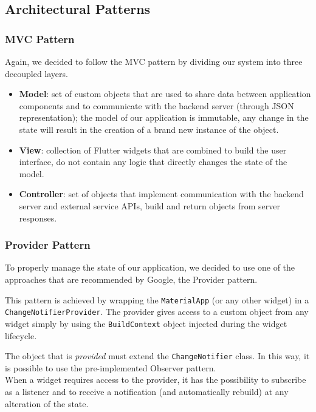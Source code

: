 \subsection{Architectural Patterns}

\subsubsection{MVC Pattern}
Again, we decided to follow the MVC pattern by dividing our system into three decoupled layers.
\begin{itemize}
      \item \textbf{Model}:
            set of custom objects that are used to share data between application components and to communicate with the backend server (through JSON representation);
            the model of our application is immutable, any change in the state will result in the creation of a brand new instance of the object.
      \item \textbf{View}:
            collection of Flutter widgets that are combined to build the user interface, do not contain any logic that directly changes the state of the model.
      \item \textbf{Controller}:
            set of objects that implement communication with the backend server and external service APIs, build and return objects from server responses.
\end{itemize}

\subsubsection{Provider Pattern}
\label{provider}
To properly manage the state of our application, we decided to use one of the approaches that are recommended by Google, the Provider pattern.

This pattern is achieved by wrapping the \texttt{MaterialApp} (or any other widget) in a \texttt{ChangeNotifierProvider}.
The provider gives access to a custom object from any widget simply by using the \texttt{BuildContext} object injected during the widget lifecycle.

The object that is \textit{provided} must extend the \texttt{ChangeNotifier} class. In this way, it is possible to use the pre-implemented Observer pattern.\\
When a widget requires access to the provider, it has the possibility to subscribe as a listener and to receive a notification (and automatically rebuild) at any alteration of the state.

